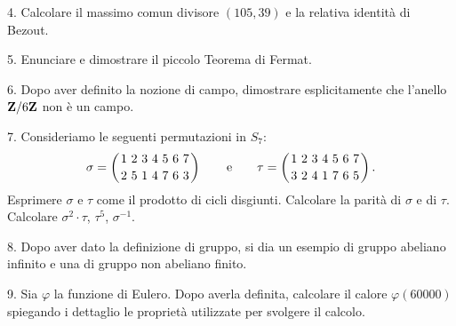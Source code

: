 \ve\vs   %
\item{4.} Calcolare il massimo comun divisore $(105,39)$ e la relativa identit\`a di Bezout.\ve\vs     %
\item{5.} Enunciare e dimostrare il piccolo Teorema di Fermat.\vv
\item{6.} Dopo aver definito la nozione di campo, dimostrare esplicitamente che l'anello ${\bf Z}/6{\bf Z}$
non \`e un campo.\ve\vs    %
\item{7.} Consideriamo le seguenti permutazioni in $S_7$:
$$\sigma=\left({1\ 2\ 3\ 4\ 5\ 6\ 7\atop 2\ 5\ 1\ 4\ 7\ 6\ 3}\right)\qquad{\rm e}\qquad 
\tau=\left({1\ 2\ 3\ 4\ 5\ 6\ 7\atop 3\ 2\ 4\ 1\ 7\ 6\ 5}\right).$$ 
 Esprimere $\sigma$ e $\tau$ come il prodotto di cicli disgiunti.\medskip
{} Calcolare la parit\`a di $\sigma$ e di $\tau$.\medskip
{} Calcolare $\sigma^2\cdot\tau$, $\tau^5$, $\sigma^{-1}$.\ve \vs      %
\item{8.} Dopo aver dato la definizione di gruppo, si dia un esempio di gruppo abeliano 
infinito e una di gruppo non abeliano finito.\vv
\item{9.} Sia $\varphi$ la funzione di Eulero. 
Dopo averla definita, calcolare il calore $\varphi(60000)$ spiegando i dettaglio
le propriet\`a utilizzate per svolgere il calcolo.  %
\bye
